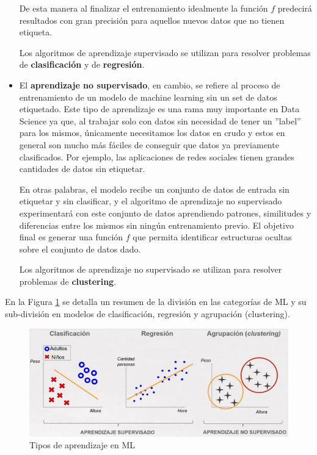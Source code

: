 \documentclass[12pt,a4paper]{article}
\begin{document}
\begin{sloppypar}
\begin{itemize}
De esta manera al finalizar el entrenamiento idealmente la función $f$ predecirá resultados con gran precisión para aquellos nuevos datos que no tienen etiqueta. 

Los algoritmos de aprendizaje supervisado se utilizan para resolver problemas de \textbf{clasificación} y de \textbf{regresión}.

\item El \textbf{aprendizaje no supervisado}\cite{intro_clasificacion_ML}, en cambio, se refiere al proceso de entrenamiento de un modelo de machine learning sin un set de datos etiquetado. Este tipo de aprendizaje es una rama muy importante en Data Science ya que, al trabajar solo con datos sin necesidad de tener un ”label” para los mismos, únicamente necesitamos los datos en crudo y estos en general son mucho más fáciles de conseguir que datos ya previamente clasificados. Por ejemplo, las aplicaciones de redes sociales tienen grandes cantidades de datos sin etiquetar.  

En otras palabras, el modelo recibe un conjunto de datos de entrada sin etiquetar y sin clasificar, y el algoritmo de aprendizaje no supervisado experimentará con este conjunto de datos aprendiendo patrones, similitudes y diferencias entre los mismos sin ningún entrenamiento previo. El objetivo final es generar una función $f$ que permita identificar estructuras ocultas sobre el conjunto de datos dado.

Los algoritmos de aprendizaje no supervisado se utilizan para resolver problemas de \textbf{clustering}.
\end{itemize}

\cleardoublepage
En la Figura \ref{fig:Clasif_algoritmos} se detalla un resumen de la división en las categorías de ML y su sub-división en modelos de clasificación, regresión y agrupación (clustering). 

\begin{figure}[H]    %
  \centering
  \includegraphics[width=1\textwidth]{images/Clasificacion_algoritmos.png}
  \caption[Tipos de aprendizaje en ML]{Tipos de aprendizaje en ML\protect\footnotemark}  
  \label{fig:Clasif_algoritmos}
\end{figure}


\end{sloppypar}
\end{document}
